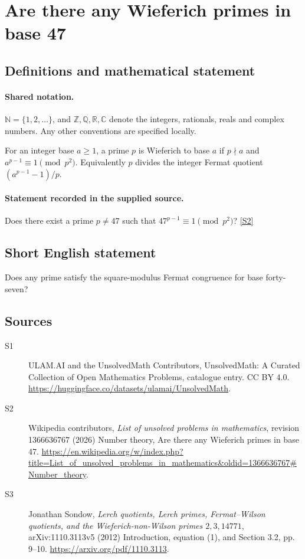 \documentclass[11pt]{article}
\newcommand{\sref}[2]{\hyperlink{source:#1:#2}{[S#2]}}
\begin{document}
\section{Are there any Wieferich primes in base 47}\label{statement}

\subsection{Definitions and mathematical statement}

\paragraph{Shared notation.}$\mathbb N=\{1,2,\ldots\}$, and $\mathbb Z,\mathbb Q,\mathbb R,\mathbb C$ denote the integers, rationals, reals and complex numbers. Any other conventions are specified locally.


For an integer base $a\ge1$, a prime $p$ is Wieferich to base $a$ if $p\nmid a$ and $a^{p-1}\equiv1\pmod{p^2}$. Equivalently $p$ divides the integer Fermat quotient $(a^{p-1}-1)/p$.
\paragraph{Statement recorded in the supplied source.}
Does there exist a prime $p\ne47$ such that $47^{p-1}\equiv1\pmod{p^2}$? \sref{statement}{2}
\subsection{Short English statement}
Does any prime satisfy the square-modulus Fermat congruence for base forty-seven?
\subsection{Sources}
\begin{description}
\item[\hypertarget{source:statement:1}{S1}] ULAM.AI and the UnsolvedMath Contributors, UnsolvedMath: A Curated Collection of Open Mathematics Problems, catalogue entry. CC BY 4.0. \url{https://huggingface.co/datasets/ulamai/UnsolvedMath}.
\item[\hypertarget{source:statement:2}{S2}] Wikipedia contributors, \emph{List of unsolved problems in mathematics}, revision 1366636767 (2026) Number theory, Are there any Wieferich primes in base 47. \url{https://en.wikipedia.org/w/index.php?title=List_of_unsolved_problems_in_mathematics&oldid=1366636767#Number_theory}.
\item[\hypertarget{source:statement:3}{S3}] Jonathan Sondow, \emph{Lerch quotients, Lerch primes, Fermat--Wilson quotients, and the Wieferich-non-Wilson primes $2,3,14771$}, arXiv:1110.3113v5 (2012) Introduction, equation (1), and Section 3.2, pp. 9--10. \url{https://arxiv.org/pdf/1110.3113}.
\end{description}
\label{end:statement}
\end{document}
